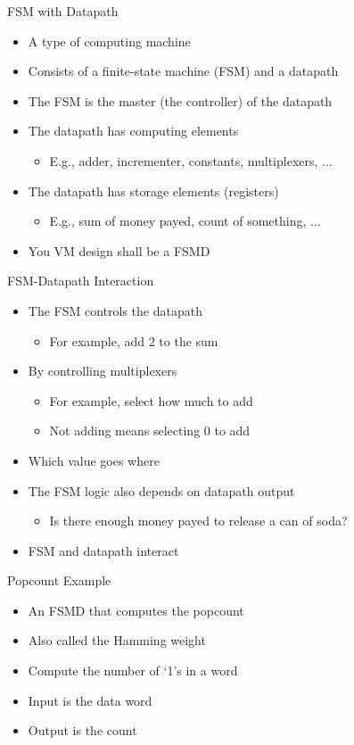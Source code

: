 \begin{frame}[fragile]{FSM with Datapath}
\begin{itemize}
\item A type of computing machine
\item Consists of a finite-state machine (FSM) and a datapath
\item The FSM is the master (the controller) of the datapath
\item The datapath has computing elements
\begin{itemize}
\item E.g., adder, incrementer, constants, multiplexers, ...
\end{itemize}
\item The datapath has storage elements (registers)
\begin{itemize}
\item E.g., sum of money payed, count of something, ...
\end{itemize}
\item You VM design shall be a FSMD
\end{itemize}
\end{frame}

\begin{frame}[fragile]{FSM-Datapath Interaction}
\begin{itemize}
\item The FSM controls the datapath
\begin{itemize}
\item For example, add 2 to the sum
\end{itemize}
\item By controlling multiplexers
\begin{itemize}
\item For example, select how much to add
\item Not adding means selecting 0 to add
\end{itemize}
\item Which value goes where
\item The FSM logic also depends on datapath output
\begin{itemize}
\item Is there enough money payed to release a can of soda?
\end{itemize}
\item FSM and datapath interact
\end{itemize}
\end{frame}


\begin{frame}[fragile]{Popcount Example}
\begin{itemize}
\item An FSMD that computes the popcount
\item Also called the Hamming weight
\item Compute the number of `1's in a word
\item Input is the data word
\item Output is the count
\end{itemize}
\end{frame}

